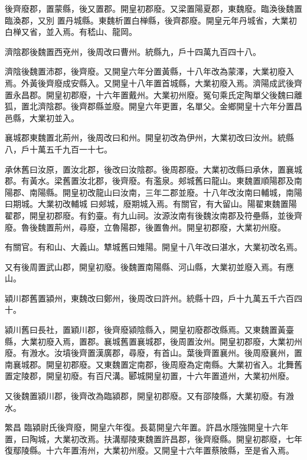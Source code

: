 \begin{pinyinscope}
 後齊廢郡，置蒙縣，後又置郡。開皇初郡廢。又梁置陽夏郡，東魏廢。臨渙後魏置臨渙郡，又別
 置丹城縣。東魏析置白椫縣，後齊郡廢。開皇元年丹城省，大業初白椫又省，並入焉。有嵇山、龍岡。



 濟陰郡後魏置西兗州，後周改曰曹州。統縣九，戶十四萬九百四十八。



 濟陰後魏置沛郡，後齊廢。又開皇六年分置黃縣，十八年改為蒙澤，大業初廢入焉。外黃後齊廢成安縣入。又開皇十八年置首城縣，大業初廢入焉。濟陽成武後齊置永昌郡。開皇初郡廢，十六年置戴州。大業初州廢。冤句乘氏定陶單父後魏曰離狐，置北濟陰郡。後齊郡縣並廢。開皇六年更置，名單父。金鄉開皇十六年分置昌邑縣，大業初並入。



 襄城郡東魏置北荊州，後周改曰和州。開皇初改為伊州，大業初改曰汝州。統縣八，戶十萬五千九百一十七。



 承休舊曰汝原，置汝北郡，後改曰汝陰郡。後周郡廢。大業初改縣曰承休，置襄城郡。有黃水。梁舊置汝北郡，後齊廢。有濫泉。郟城舊曰龍山。東魏置順陽郡及南陽郡、南陽縣。開皇初改龍山曰汝南，三年二郡並廢。十八年改汝南曰輔城，南陽曰期城。大業初改輔城
 曰郟城，廢期城入焉。有關官，有大留山。陽翟東魏置陽翟郡，開皇初郡廢。有釣臺。有九山祠。汝源汝南有後魏汝南郡及符壘縣，並後齊廢。魯後魏置荊州，尋廢，立魯陽郡，後置魯州。開皇初郡廢，大業初州廢。



 有關官。有和山、大義山。犨城舊曰雉陽。開皇十八年改曰湛水，大業初改名焉。



 又有後周置武山郡，開皇初廢。後魏置南陽縣、河山縣，大業初並廢入焉。有應山。



 潁川郡舊置潁州，東魏改曰鄭州，後周改曰許州。統縣十四，戶十九萬五千六百四十。



 潁川舊曰長社，置穎川郡，後齊廢潁陰縣入，開皇初廢郡改縣焉。又東魏置黃臺縣，大業初廢入焉，置郡。襄城舊置襄城郡，後周置汝州。開皇初郡廢，大業初州廢。有溵水。汝墳後齊置漢廣郡，尋廢，有首山。葉後齊置襄州。後周廢襄州，置南襄城郡。開皇初郡廢。又東魏置定南郡，後周廢為定南縣。大業初省入。北舞舊置定陵郡，開皇初廢。有百尺溝。郾城開皇初置，十六年置道州，大業初州廢。



 又後魏置潁川郡，後齊改為臨潁郡，開皇初郡廢。又有邵陵縣，大業初廢。有溵水。



 繁昌
 臨潁尉氏後齊廢，開皇六年復。長葛開皇六年置。許昌水隱強開皇十六年置，曰陶城，大業初改焉。扶溝鄢陵東魏置許昌郡，後齊廢縣。開皇初郡廢，七年復鄢陵縣。十六年置洧州，大業初州廢。又開皇十六年置蔡陂縣，至是省入焉。




\end{pinyinscope}

